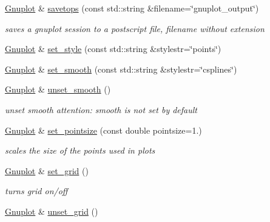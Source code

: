 \begin{DoxyCompactItemize}
\mbox{\label{classGnuplot_a032072c7c01b508a7535a17fb08562b1}} 
\hyperlink{classGnuplot}{Gnuplot} \& \hyperlink{classGnuplot_a032072c7c01b508a7535a17fb08562b1}{savetops} (const std\+::string \&filename=\char`\"{}gnuplot\+\_\+output\char`\"{})
\begin{DoxyCompactList}\small\item\em saves a gnuplot session to a postscript file, filename without extension \end{DoxyCompactList}\item 
\hyperlink{classGnuplot}{Gnuplot} \& \hyperlink{classGnuplot_acfdcda292650775ebed4683e8e1515b5}{set\+\_\+style} (const std\+::string \&stylestr=\char`\"{}points\char`\"{})
\item 
\hyperlink{classGnuplot}{Gnuplot} \& \hyperlink{classGnuplot_aa18386919da2ec4c994f1f9c7195d384}{set\+\_\+smooth} (const std\+::string \&stylestr=\char`\"{}csplines\char`\"{})
\item 
\hyperlink{classGnuplot}{Gnuplot} \& \hyperlink{classGnuplot_ad9dfbccd66dece1dbe5803605c6ab08c}{unset\+\_\+smooth} ()
\begin{DoxyCompactList}\small\item\em unset smooth attention\+: smooth is not set by default \end{DoxyCompactList}\item 
\mbox{\label{classGnuplot_a95ec1636a871447dfe99463b769339c7}} 
\hyperlink{classGnuplot}{Gnuplot} \& \hyperlink{classGnuplot_a95ec1636a871447dfe99463b769339c7}{set\+\_\+pointsize} (const double pointsize=1.)
\begin{DoxyCompactList}\small\item\em scales the size of the points used in plots \end{DoxyCompactList}\item 
\mbox{\label{classGnuplot_a5416c8e81f1b9945b9631fa85a8d4f47}} 
\hyperlink{classGnuplot}{Gnuplot} \& \hyperlink{classGnuplot_a5416c8e81f1b9945b9631fa85a8d4f47}{set\+\_\+grid} ()
\begin{DoxyCompactList}\small\item\em turns grid on/off \end{DoxyCompactList}\item 
\mbox{\label{classGnuplot_a53183e1487bc6977f0d46bf75d19b4d3}} 
\hyperlink{classGnuplot}{Gnuplot} \& \hyperlink{classGnuplot_a53183e1487bc6977f0d46bf75d19b4d3}{unset\+\_\+grid} ()

\end{DoxyCompactItemize}
